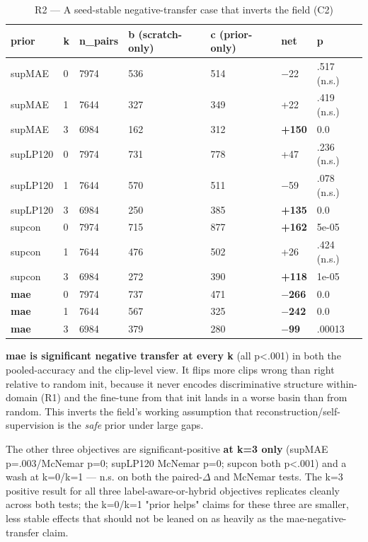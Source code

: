\begin{table}[!t]
\centering
\caption{R2 --- A seed-stable negative-transfer case that inverts the field (C2)}
\small
\begin{tabular}{lllllll}
\toprule
prior & k & n\_pairs & b (scratch-only) & c (prior-only) & net & p \\
\midrule
supMAE & 0 & 7974 & 536 & 514 & $-$22 & .517 (n.s.) \\
supMAE & 1 & 7644 & 327 & 349 & +22 & .419 (n.s.) \\
supMAE & 3 & 6984 & 162 & 312 & \textbf{+150} & 0.0 \\
supLP120 & 0 & 7974 & 731 & 778 & +47 & .236 (n.s.) \\
supLP120 & 1 & 7644 & 570 & 511 & $-$59 & .078 (n.s.) \\
supLP120 & 3 & 6984 & 250 & 385 & \textbf{+135} & 0.0 \\
supcon & 0 & 7974 & 715 & 877 & \textbf{+162} & 5e-05 \\
supcon & 1 & 7644 & 476 & 502 & +26 & .424 (n.s.) \\
supcon & 3 & 6984 & 272 & 390 & \textbf{+118} & 1e-05 \\
\textbf{mae} & 0 & 7974 & 737 & 471 & \textbf{$-$266} & 0.0 \\
\textbf{mae} & 1 & 7644 & 567 & 325 & \textbf{$-$242} & 0.0 \\
\textbf{mae} & 3 & 6984 & 379 & 280 & \textbf{$-$99} & .00013 \\
\bottomrule
\end{tabular}
\end{table}

\textbf{mae is significant negative transfer at every k} (all p<.001) in both the pooled-accuracy and the clip-level view. It flips more clips wrong than right relative to random init, because it never encodes discriminative structure within-domain (R1) and the fine-tune from that init lands in a worse basin than from random. This inverts the field's working assumption that reconstruction/self-supervision is the \textit{safe} prior under large gaps.

The other three objectives are significant-positive \textbf{at k=3 only} (supMAE p=.003/McNemar p=0; supLP120 McNemar p=0; supcon both p<.001) and a wash at k=0/k=1 --- n.s. on both the paired-$\Delta$ and McNemar tests. The k=3 positive result for all three label-aware-or-hybrid objectives replicates cleanly across both tests; the k=0/k=1 "prior helps" claims for these three are smaller, less stable effects that should not be leaned on as heavily as the mae-negative-transfer claim.

